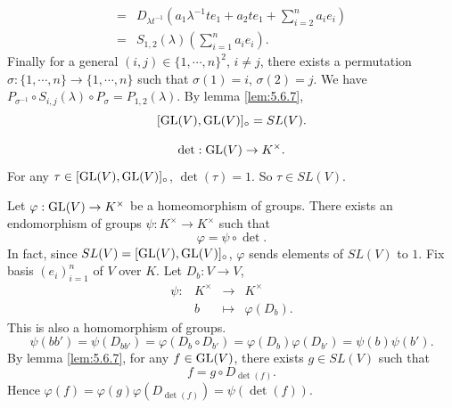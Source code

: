 \begin{proofenv}
$$\begin{aligned}
        = & D_{\lambda t^{-1}} \left(a_1 \lambda^{-1} t e_1 + a_2 t e_1 + \sum_{i=2}^{n}a_i e_i\right)\\
        = & S_{1,2}(\lambda) \left(\sum_{i=1}^{n}a_i e_i\right).
    \end{aligned}$$
    Finally for a general $(i,j) \in \{1,\cdots,n\}^2$, $i \neq j$, there exists a permutation $\sigma : \{1,\cdots,n\} \rightarrow \{1,\cdots,n\}$ such that $\sigma(1) = i$, $\sigma(2) = j$.
    We have $P_{\sigma^{-1}} \circ S_{i,j}(\lambda) \circ P_{\sigma} = P_{1,2}(\lambda)$.
    By lemma \ref{lem:5.6.7},
    $$[\operatorname{\mathrm{GL}}(V), \operatorname{\mathrm{GL}}(V)]_{\circ} = SL(V).$$
\end{proofenv}

\begin{remark}
    $$\det : \operatorname{\mathrm{GL}}(V) \rightarrow K^\times.$$
    For any $\tau \in [\operatorname{\mathrm{GL}}(V), \operatorname{\mathrm{GL}}(V)]_{\circ}$, $\det(\tau) = 1$.
    So $\tau \in SL(V)$.
\end{remark}

\begin{remark}\label{5.6.8}
    Let $\varphi : \operatorname{\mathrm{GL}}(V) \rightarrow K^\times$ be a homeomorphism of groups.
    There exists an endomorphism of groups $\psi : K^\times \rightarrow K^\times$ such that
    $$\varphi = \psi \circ \det.$$
    \quad In fact, since $SL(V) = [\operatorname{\mathrm{GL}}(V), \operatorname{\mathrm{GL}}(V)]_{\circ}$, $\varphi$ sends elements of $SL(V)$ to $1$.
    Fix basis $(e_i)_{i=1}^{n}$ of $V$ over $K$.
    Let $D_{b} : V \rightarrow V$,
    $$\begin{array}{rrcl}
        \psi : & K^\times & \longrightarrow & K^\times\\
        & b & \longmapsto & \varphi(D_{b}).
    \end{array}$$
    This is also a homomorphism of groups.
    $$\psi(bb') = \psi(D_{bb'}) = \varphi(D_{b}\circ D_{b'}) = \varphi(D_{b}) \varphi(D_{b'}) = \psi(b)\psi(b').$$
    By lemma \ref{lem:5.6.7}, for any $f \in \operatorname{\mathrm{GL}}(V)$, there exists $g \in SL(V)$ such that
    $$f = g \circ D_{\det(f)}.$$
    Hence $\varphi(f) = \varphi(g) \varphi(D_{\det(f)}) = \psi(\det(f)).$
\end{remark}

